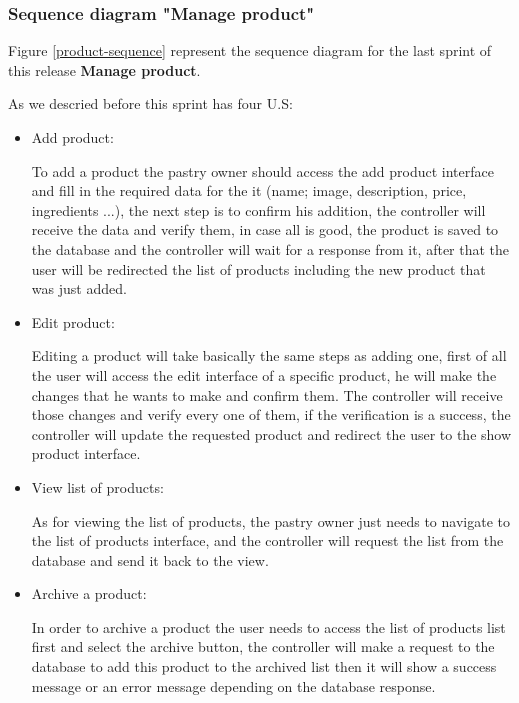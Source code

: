 \documentclass[12pt,a4paper]{report}
\begin{document}
\subsubsection*{Sequence diagram "Manage product"}
Figure \ref{product-sequence} represent the sequence diagram for the last sprint of this release \textbf{Manage product}.\par 
As we descried before this sprint has four U.S:
\begin{itemize}
	\item Add product: \par 
	To add a product the pastry owner should access the add product interface and fill in the required data for the it (name; image, description, price, ingredients ...), the next step is to confirm his addition, the controller will receive the data and verify them, in case all is good, the product is saved to the database and the controller will wait for a response from it, after that the user will be redirected the list of products including the new product that was just added.
	\item Edit product: \par 
	Editing a product will take basically the same steps as adding one, first of all the user will access the edit interface of a specific product, he will make the changes that he wants to make and confirm them. The controller will receive those changes and verify every one of them, if the verification is a success, the controller will update the requested product and redirect the user to the show product interface.
	\item View list of products: \par 
	As for viewing the list of products, the pastry owner just needs to navigate to the list of products interface, and the controller will request the list from the database and send it back to the view.
	\item Archive a product: \par 
	In order to archive a product the user needs to access the list of products list first and select the archive button, the controller will make a request to the database to add this product to the archived list then it will show a success message or an error message depending on the database response. 
\end{itemize}
\end{document}
